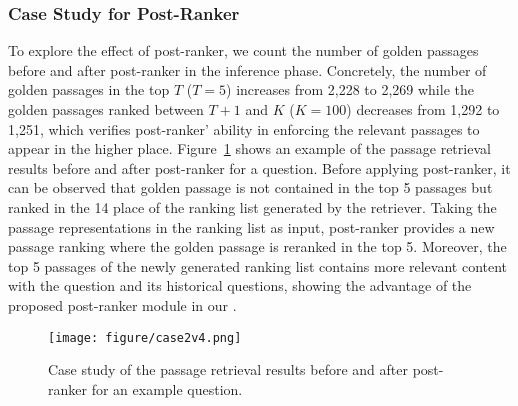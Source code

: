 \subsubsection{Case Study for Post-Ranker}
To explore the effect of post-ranker, we count the number of golden passages before and after post-ranker in the inference phase. Concretely, the number of golden passages in the top $T$ ($T=5$) increases from 2,228 to 2,269 while the golden passages ranked between $T+1$ and $K$ ($K=100$) decreases from 1,292 to 1,251, which verifies post-ranker' ability in enforcing the relevant passages to appear in the higher place. Figure~\ref{fig:case1} shows an example of the passage retrieval results before and after post-ranker for a question. Before applying post-ranker, it can be observed that golden passage is not contained in the top 5 passages but ranked in the 14 place of the ranking list generated by the retriever. Taking the passage representations in the ranking list as input, post-ranker provides a new passage ranking where the golden passage is reranked in the top 5. Moreover, the top 5 passages of the newly generated ranking list contains more relevant content with the question and its historical questions, showing the advantage of the proposed post-ranker module in our {\modelname}.  
\begin{figure}[t]
    \centering
    \texttt{[image: figure/case2v4.png]}
    \vspace{-0.3in}
    \caption{Case study of the passage retrieval results before and after post-ranker for an example question.}
    \label{fig:case1}
    \vspace{-0.15in}
\end{figure}


